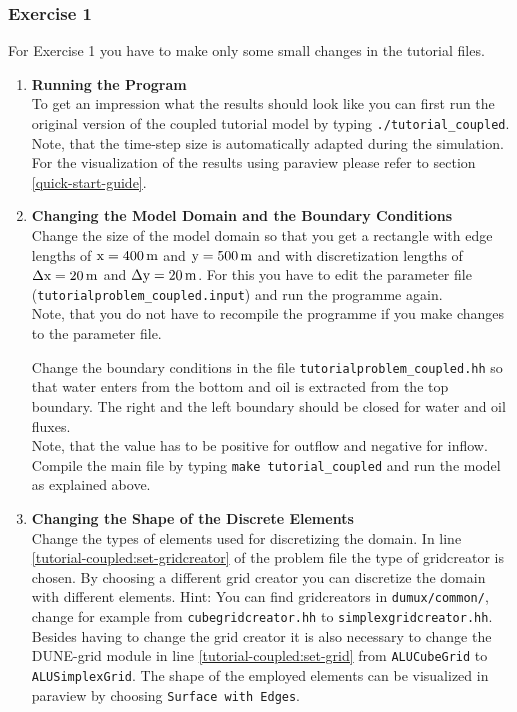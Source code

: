 \subsubsection{Exercise 1}
\renewcommand{\labelenumi}{\alph{enumi})} For Exercise 1 you have
to make only some small changes in the tutorial files.  

\begin{enumerate}

\item \textbf{Running the Program} \\
  To get an impression what the results should look like you can first run the original version of 
the coupled tutorial model by typing  \texttt{./tutorial\_coupled}. 
Note, that the time-step size is automatically adapted during the simulation. 
For the visualization of the results using paraview please refer to section \ref{quick-start-guide}.


\item \textbf{Changing the Model Domain and the Boundary Conditions} \\
  Change the size of the model domain so that you get a rectangle with
  edge lengths of $\text{x} = \unit[400]{m}$ and $\text{y} = \unit[500]{m}$ and with
  discretization lengths of $\Delta \text{x} = \unit[20]{m}$ and $\Delta
  \text{y} = \unit[20]{m}$. For this you have to edit the parameter file (\texttt{tutorialproblem\_coupled.input}) 
  and run the programme again.\\
  Note, that you do not have to recompile the programme if you make changes to the parameter file.

  
  Change the boundary conditions in the file
  \texttt{tutorialproblem\_coupled.hh} so that water enters from the
  bottom and oil is extracted from the top boundary. The right and the
  left boundary should be closed for water and oil fluxes. \\
  Note, that the value has to be positive for outflow and negative for inflow.  
  Compile the main file by typing \texttt{make tutorial\_coupled} and
  run the model as explained above.

  \item \textbf{Changing  the Shape of the Discrete Elements} \\
  Change the types of elements used for discretizing the domain. In line \ref{tutorial-coupled:set-gridcreator} of the problem 
  file  the type of gridcreator is chosen. By choosing a different grid creator you can discretize the domain with different elements. 
  Hint: You can find gridcreators in \texttt{dumux/common/}, change for example from \texttt{cubegridcreator.hh} to \texttt{simplexgridcreator.hh}. 
  Besides having to change the grid creator it is also necessary to change the DUNE-grid module in line \ref{tutorial-coupled:set-grid} from \texttt{ALUCubeGrid} 
  to \texttt{ALUSimplexGrid}.
  The shape of the employed elements can be visualized in paraview by choosing \texttt{Surface with Edges}. 


\end{enumerate}
